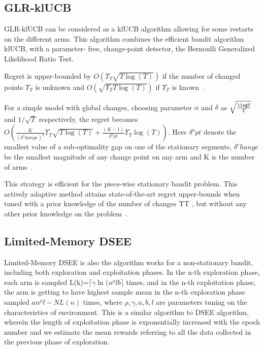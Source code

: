 \subsection{GLR-klUCB}\label{subsec:glr-klucb}
GLR-klUCB can be considered as a klUCB algorithm allowing for some restarts on the different arms. This algorithm combines the efficient bandit algorithm klUCB, with a parameter- free, change-point detector, the Bernoulli Generalized Likelihood Ratio Test.
\par
Regret is upper-bounded by $ O\left(\Upsilon_T \sqrt{T \log\left(T\right)} \right)$ if the number of changed points $\Upsilon_T $ is unknown and $ O\left(\sqrt{\Upsilon_T T \log\left(T\right)} \right)$ if  $\Upsilon_T $ is known~\citep{Besson2019}.
\par
For a simple model with global changes, choosing parameter $\alpha$ and $\delta $ as $\sqrt{\frac{\logT}{T}}$ and $1/\sqrt{T}$ respectively, the regret becomes $O\left(\frac{K}{\left(\delta^change\right)^2} \Upsilon_T \sqrt{T \log\left(T\right)}+\frac{\left(K-1\right)}{\delta^opt} \Upsilon_T \log\left(T\right)\right)$.
Here $\delta^opt$ denote the smallest value of a sub-optimality gap on one of the stationary segments, $\delta^change$ be the smallest magnitude of any change point on any arm and K is the number of arms~\citep{Besson2019}.
\par
This strategy is efficient for the piece-wise stationary bandit problem.
This actively adaptive method attains state-of-the-art regret upper-bounds when tuned with a prior knowledge of the number of changes ΥT , but without any other prior knowledge on the problem~\citep{Besson2019}.

\subsection{Limited-Memory DSEE} %
Limited-Memory DSEE is also the algorithm works for a non-stationary bandit, including both exploration and exploitation phases. In the n-th exploration phase, each arm is sampled L(k)=$\lceil\gamma\ln({n^{\rho}lb}\rceil$ times, and in the n-th exploitation phase, the arm is getting to have highest sample mean in the n-th exploration phase sampled $an^{\rho}l-NL(n)$ times, where $\rho, \gamma,a,b,l$ are parameters tuning on the characteristics of environment.
\newline This is a similar algorithm to DSEE algorithm, wherein the length of exploitation phase is exponentially increased with the epoch number and we estimate the mean rewards referring to all the data collected in the previous phase of exploration.\citep{wei2018abruptly}


